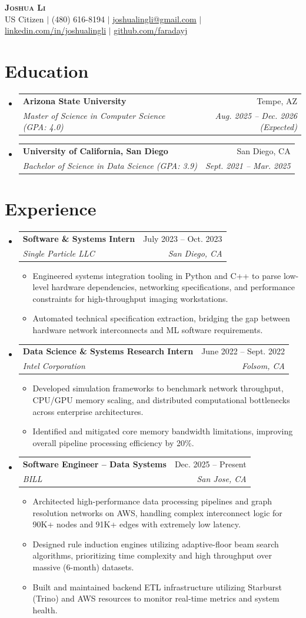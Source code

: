 \documentclass[letterpaper,11pt]{article}
\makeatletter
\newcommand{\resumeItem}[1]{\item\small{{#1 \vspace{-2pt}}}}
\newcommand{\resumeSubheading}[4]{
  \vspace{-2pt}\item
    \begin{tabular*}{0.97\textwidth}[t]{l@{\extracolsep{\fill}}r}
      \textbf{#1} & #2 \\
      \textit{\small#3} & \textit{\small #4} \\
    \end{tabular*}\vspace{-7pt}
}
\newcommand{\resumeSubHeadingListStart}{\begin{itemize}[leftmargin=0.15in, label={}]}
\newcommand{\resumeSubHeadingListEnd}{\end{itemize}}
\newcommand{\resumeItemListStart}{\begin{itemize}}
\newcommand{\resumeItemListEnd}{\end{itemize}\vspace{-5pt}}
\makeatother
\begin{document}
\begin{center}
    \textbf{\Huge \scshape Joshua Li} \\ \vspace{1pt}
    \small US Citizen $|$ (480) 616-8194 $|$ 
    \href{mailto:joshualingli@gmail.com}{\underline{joshualingli@gmail.com}} $|$ 
    \href{https://linkedin.com/in/joshualingli}{\underline{linkedin.com/in/joshualingli}} $|$
    \href{https://github.com/faradayj}{\underline{github.com/faradayj}}
\end{center}

\section{Education}
  \resumeSubHeadingListStart
    \resumeSubheading
      {Arizona State University}{Tempe, AZ}
      {Master of Science in Computer Science (GPA: 4.0)}{Aug. 2025 -- Dec. 2026 (Expected)}
    \resumeSubheading
      {University of California, San Diego}{San Diego, CA}
      {Bachelor of Science in Data Science (GPA: 3.9)}{Sept. 2021 -- Mar. 2025}
  \resumeSubHeadingListEnd

\section{Experience}
  \resumeSubHeadingListStart
    \resumeSubheading
      {Software \& Systems Intern}{July 2023 -- Oct. 2023}
      {Single Particle LLC}{San Diego, CA}
      \resumeItemListStart
        \resumeItem{Engineered systems integration tooling in Python and C++ to parse low-level hardware dependencies, networking specifications, and performance constraints for high-throughput imaging workstations.}
        \resumeItem{Automated technical specification extraction, bridging the gap between hardware network interconnects and ML software requirements.}
      \resumeItemListEnd

    \resumeSubheading
      {Data Science \& Systems Research Intern}{June 2022 -- Sept. 2022}
      {Intel Corporation}{Folsom, CA}
      \resumeItemListStart
        \resumeItem{Developed simulation frameworks to benchmark network throughput, CPU/GPU memory scaling, and distributed computational bottlenecks across enterprise architectures.}
        \resumeItem{Identified and mitigated core memory bandwidth limitations, improving overall pipeline processing efficiency by 20\%.}
      \resumeItemListEnd

    \resumeSubheading
      {Software Engineer -- Data Systems}{Dec. 2025 -- Present}
      {BILL}{San Jose, CA}
      \resumeItemListStart
        \resumeItem{Architected high-performance data processing pipelines and graph resolution networks on AWS, handling complex interconnect logic for 90K+ nodes and 91K+ edges with extremely low latency.}
        \resumeItem{Designed rule induction engines utilizing adaptive-floor beam search algorithms, prioritizing time complexity and high throughput over massive (6-month) datasets.}
        \resumeItem{Built and maintained backend ETL infrastructure utilizing Starburst (Trino) and AWS resources to monitor real-time metrics and system health.}
      \resumeItemListEnd
  \resumeSubHeadingListEnd
\end{document}
